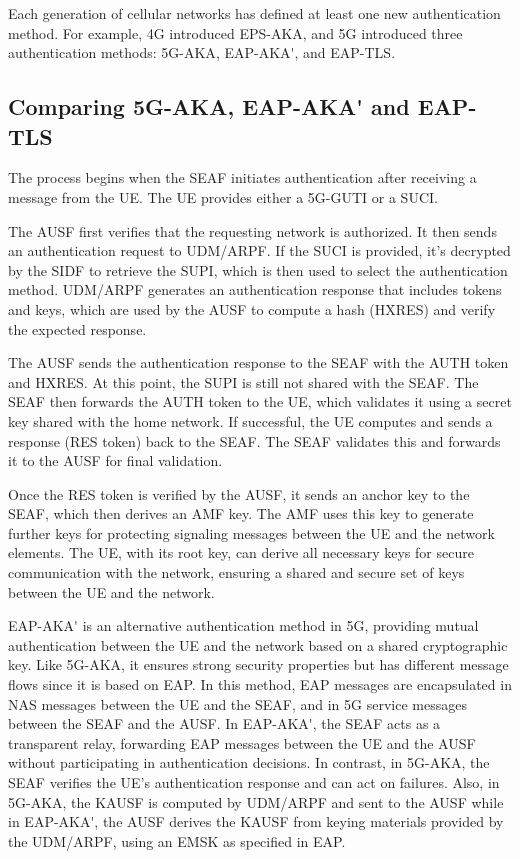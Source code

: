 Each generation of cellular networks has defined at least one new authentication method. For example, \ac{4G} introduced \ac{EPS-AKA}, and \ac{5G} introduced three authentication methods: \ac{5G-AKA}, \ac{EAP-AKA'}, and \ac{EAP-TLS}.

\subsection{Comparing \acs{5G-AKA}, \ac{EAP-AKA'} and \ac{EAP-TLS}}

The process begins when the \ac{SEAF} initiates authentication after receiving a message from the \ac{UE}. The \ac{UE} provides either a \ac{5G-GUTI} or a \ac{SUCI}.

The \ac{AUSF} first verifies that the requesting network is authorized. It then sends an authentication request to \ac{UDM}/\ac{ARPF}. If the \ac{SUCI} is provided, it's decrypted by the \ac{SIDF} to retrieve the \ac{SUPI}, which is then used to select the authentication method. \ac{UDM}/\ac{ARPF} generates an authentication response that includes tokens and keys, which are used by the \ac{AUSF} to compute a hash (\ac{HXRES}) and verify the expected response.

The \ac{AUSF} sends the authentication response to the \ac{SEAF} with the \ac{AUTH} token and \ac{HXRES}. At this point, the \ac{SUPI} is still not shared with the \ac{SEAF}. The \ac{SEAF} then forwards the \ac{AUTH} token to the \ac{UE}, which validates it using a secret key shared with the home network. If successful, the \ac{UE} computes and sends a response (\ac{RES} token) back to the \ac{SEAF}. The \ac{SEAF} validates this and forwards it to the \ac{AUSF} for final validation.

Once the \ac{RES} token is verified by the \ac{AUSF}, it sends an anchor key to the \ac{SEAF}, which then derives an \ac{AMF} key. The \ac{AMF} uses this key to generate further keys for protecting signaling messages between the \ac{UE} and the network elements. The \ac{UE}, with its root key, can derive all necessary keys for secure communication with the network, ensuring a shared and secure set of keys between the \ac{UE} and the network.

\ac{EAP-AKA'} is an alternative authentication method in \ac{5G}, providing mutual authentication between the \ac{UE} and the network based on a shared cryptographic key. Like \ac{5G-AKA}, it ensures strong security properties but has different message flows since it is based on \ac{EAP}. In this method, \ac{EAP} messages are encapsulated in \ac{NAS} messages between the \ac{UE} and the \ac{SEAF}, and in \ac{5G} service messages between the \ac{SEAF} and the \ac{AUSF}. In \ac{EAP-AKA'}, the \ac{SEAF} acts as a transparent relay, forwarding \ac{EAP} messages between the \ac{UE} and the \ac{AUSF} without participating in authentication decisions. In contrast, in \ac{5G-AKA}, the \ac{SEAF} verifies the \ac{UE}'s authentication response and can act on failures. Also, in 5G-AKA, the \ac{KAUSF} is computed by \ac{UDM}/\ac{ARPF} and sent to the \ac{AUSF} while in \ac{EAP-AKA'}, the \ac{AUSF} derives the \ac{KAUSF} from keying materials provided by the \ac{UDM}/\ac{ARPF}, using an \ac{EMSK} as specified in \ac{EAP}.

